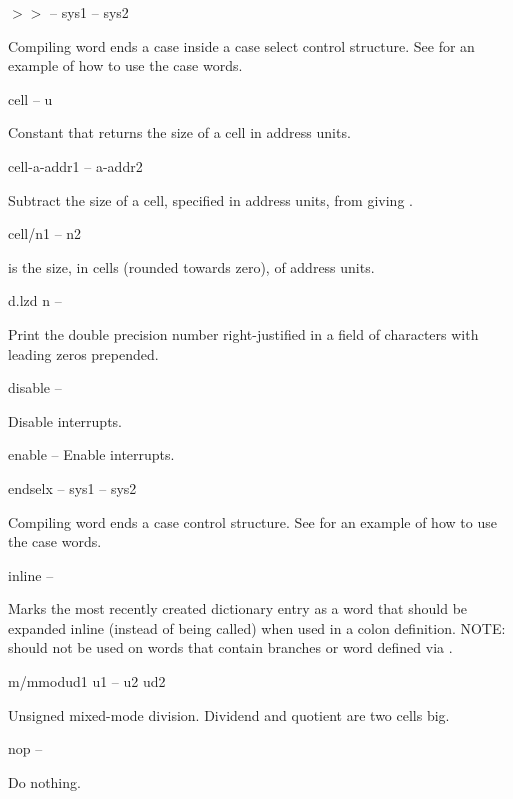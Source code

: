 \begin{cgloss}{$>>$}{ -- }{sys1 -- sys2}

Compiling word ends a case inside a case select control structure.  See
 for an example of how to use the case words.
\end{cgloss}
\begin{gloss}{cell}{ -- u}

Constant that returns the size of a cell in address units.
\end{gloss}
\begin{gloss}{cell-}{a-addr1 -- a-addr2}

Subtract the size of a cell, specified in address units, from
 giving .
\end{gloss}
\begin{gloss}{cell/}{n1 -- n2}

 is the size, in cells (rounded towards zero), of
 address units.
\end{gloss}
\begin{gloss}{d.lz}{d n -- }

Print the double precision number  right-justified in a field of
 characters with leading zeros prepended.
\end{gloss}
\begin{gloss}{disable}{ -- }

Disable interrupts.
\end{gloss}
\begin{gloss}{enable}{ -- }
Enable interrupts.
\end{gloss}
\begin{cgloss}{endsel}{x -- }{sys1 -- sys2}

Compiling word ends a case control structure.  See  for an example
of how to use the case words.
\end{cgloss}
\begin{gloss}{inline}{ -- }

Marks the most recently created dictionary entry as a word that should be
expanded inline (instead of being called) when used in a colon definition.
NOTE: should not be used on words that contain branches
or word defined via .
\end{gloss}
\begin{gloss}{m/mmod}{ud1 u1 -- u2 ud2}

Unsigned mixed-mode division.  Dividend and quotient are two cells big.
\end{gloss}
\begin{gloss}{nop}{ -- }

Do nothing.
\end{gloss}
